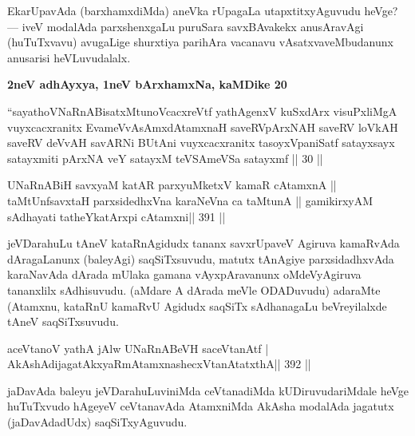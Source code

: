 \begin{artha}
EkarUpavAda (barxhamxdiMda) aneVka rUpagaLa utapxtitxyAguvudu heVge?  {\rm ---}  iveV modalAda parxshenxgaLu puruSara savxBAvakekx anusAravAgi (huTuTxvavu) avugaLige shurxtiya parihAra vacanavu vAsatxvaveMbudanunx anusarisi heVLuvudalalx.
\end{artha}

\begin{center}
{\large\bf 2neV adhAyxya, 1neV bArxhamxNa, kaMDike 20}
\end{center}

\begin{shl}
``sayathoVNaRnABisatxMtunoVcacxreVtf
yathAgenxV kuSxdArx visuPxliMgA vuyxcacxranitx
EvameVvAsAmxdAtamxnaH saveRVpArxNAH
saveRV loVkAH saveRV deVvAH savARNi
BUtAni vuyxcacxranitx tasoyxVpaniSatf satayxsayx
satayxmiti pArxNA veY satayxM teVSAmeVSa satayxmf || 30 ||
\end{shl}

\begin{center}
 \end{center}
 
\begin{shl}
UNaRnABiH savxyaM katAR parxyuMketxV kamaR cA\s\s tamxnA ||
taMtUnfsavxtaH parxsidedhxVna karaNeVna ca taMtunA ||
gamikirxyAM sAdhayati tatheYkatArxpi cA\s\s tamxni\hfill || 391 ||
\end{shl}

\begin{artha}
jeVDarahuLu tAneV kataRnAgidudx tananx savxrUpaveV Agiruva kamaRvAda  dAragaLanunx  (baleyAgi) saqSiTxsuvudu, matutx tAnAgiye parxsidadhxvAda  karaNavAda dArada mUlaka gamana vAyxpAravanunx oMdeVyAgiruva tananxlilx  sAdhisuvudu. (aMdare A dArada meVle ODADuvudu) adaraMte (Atamxnu, kataRnU kamaRvU Agidudx saqSiTx sAdhanagaLu beVreyilalxde tAneV saqSiTxsuvudu.
\end{artha}


\begin{shl}
aceVtanoV yathA jAlw UNaRnABeVH saceVtanAtf |
AkAshAdijagatAkxyaRmAtamxnashecxVtanAtatxthA\hfill || 392 ||
\end{shl}

\begin{artha}
jaDavAda baleyu jeVDarahuLuviniMda ceVtanadiMda kUDiruvudariMdale heVge huTuTxvudo hAgeyeV ceVtanavAda AtamxniMda AkAsha modalAda jagatutx (jaDavAdadUdx) saqSiTxyAguvudu.
\end{artha}


